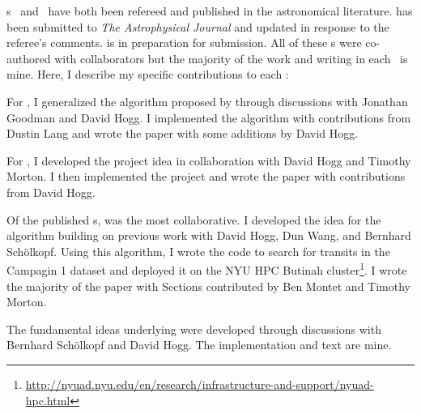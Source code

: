 \chapname s~ and~ have both been refereed and
published in the astronomical literature.
 has been submitted to \emph{The Astrophysical Journal} and updated
in response to the referee's comments.
 is in preparation for submission.
All of these \chapname s were co-authored with collaborators but the majority
of the work and writing in each \chapname\ is mine.
Here, I describe my specific contributions to each \chapname:
\begin{enumerate}

{\item For , I generalized the algorithm proposed by
\citet{Goodman:2010} through discussions with Jonathan Goodman and David Hogg.
I implemented the algorithm with contributions from Dustin Lang and wrote the
paper with some additions by David Hogg.}

{\item For , I developed the project idea in collaboration with
David Hogg and Timothy Morton.
I then implemented the project and wrote the paper with contributions from
David Hogg.}

{\item Of the published \chapname s,  was the most collaborative.
I developed the idea for the algorithm building on previous work with David
Hogg, Dun Wang, and Bernhard Sch\"olkopf.
Using this algorithm, I wrote the code to search for transits in the
 Campagin 1 dataset and deployed it on the NYU HPC Butinah
cluster\footnote{\url{http://nyuad.nyu.edu/en/research/infrastructure-and-support/nyuad-hpc.html}}.
I wrote the majority of the paper with Sections contributed by Ben Montet and
Timothy Morton.}

{\item The fundamental ideas underlying  were developed through
discussions with Bernhard Sch\"olkopf and David Hogg.
The implementation and text are mine.}

\end{enumerate}
